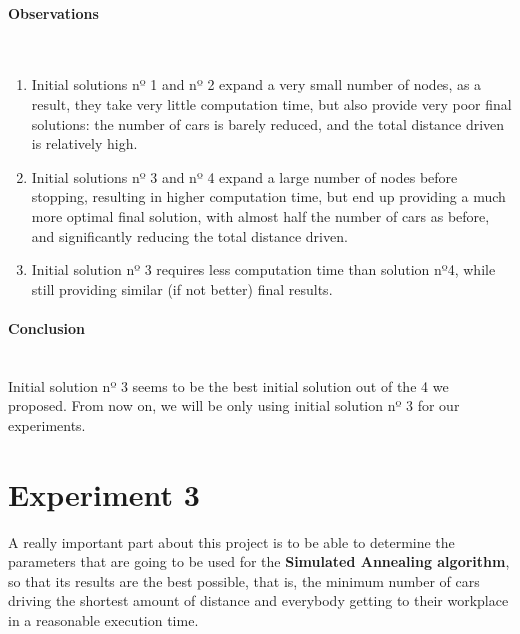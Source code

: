 \documentclass[12]{article}
\begin{document}
\paragraph{Observations}\mbox{}\\
\begin{enumerate}
\item Initial solutions nº 1 and nº 2 expand a very small number of nodes, as a result, they take very little computation time,
but also provide very poor final solutions: the number of cars is barely reduced, and the total distance driven is relatively high.

\item Initial solutions nº 3 and nº 4 expand a large number of nodes before stopping, resulting in higher computation time,
but end up providing a much more optimal final solution, with almost half the number of cars as before, and significantly reducing the total distance driven.

\item Initial solution nº 3 requires less computation time than solution nº4, while still providing similar (if not better) final results.

\end{enumerate}

\paragraph{Conclusion}\mbox{}\\
Initial solution nº 3 seems to be the best initial solution out of the 4 we proposed.
From now on, we will be only using initial solution nº 3 for our experiments.

\section{Experiment 3}

A really important part about this project is to be able to determine the parameters that are going to be used for the \textbf{Simulated Annealing algorithm}, so that its results are the best possible, that is, the minimum number of cars driving the shortest amount of distance and everybody getting to their workplace in a reasonable execution time. 
\\
\medskip
\end{document}
